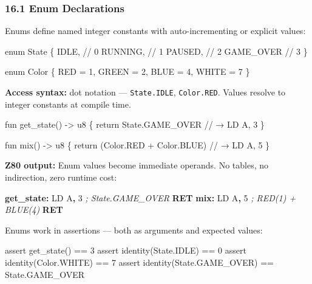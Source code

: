 \documentclass[
  11pt,
]{article}
\newenvironment{Shaded}{\begin{snugshade}}{\end{snugshade}}
\newcommand{\CommentTok}[1]{\textcolor[rgb]{0.56,0.35,0.01}{\textit{#1}}}
\newcommand{\ControlFlowTok}[1]{\textcolor[rgb]{0.13,0.29,0.53}{\textbf{#1}}}
\newcommand{\DecValTok}[1]{\textcolor[rgb]{0.00,0.00,0.81}{#1}}
\newcommand{\FunctionTok}[1]{\textcolor[rgb]{0.13,0.29,0.53}{\textbf{#1}}}
\newcommand{\NormalTok}[1]{#1}
\newcommand{\OperatorTok}[1]{\textcolor[rgb]{0.81,0.36,0.00}{\textbf{#1}}}
\begin{document}
\hypertarget{enum-declarations}{%
\subsubsection{16.1 Enum Declarations}\label{enum-declarations}}

Enums define named integer constants with auto-incrementing or explicit
values:

\begin{Shaded}
\begin{Highlighting}[]
\NormalTok{enum State \{}
\NormalTok{    IDLE,        // 0}
\NormalTok{    RUNNING,     // 1}
\NormalTok{    PAUSED,      // 2}
\NormalTok{    GAME\_OVER    // 3}
\NormalTok{\}}

\NormalTok{enum Color \{}
\NormalTok{    RED = 1,}
\NormalTok{    GREEN = 2,}
\NormalTok{    BLUE = 4,}
\NormalTok{    WHITE = 7}
\NormalTok{\}}
\end{Highlighting}
\end{Shaded}

\textbf{Access syntax:} dot notation --- \texttt{State.IDLE},
\texttt{Color.RED}. Values resolve to integer constants at compile time.

\begin{Shaded}
\begin{Highlighting}[]
\NormalTok{fun get\_state() {-}\textgreater{} u8 \{}
\NormalTok{    return State.GAME\_OVER       // → LD A, 3}
\NormalTok{\}}

\NormalTok{fun mix() {-}\textgreater{} u8 \{}
\NormalTok{    return (Color.RED + Color.BLUE)  // → LD A, 5}
\NormalTok{\}}
\end{Highlighting}
\end{Shaded}

\textbf{Z80 output:} Enum values become immediate operands. No tables,
no indirection, zero runtime cost:

\begin{Shaded}
\begin{Highlighting}[]
\FunctionTok{get\_state:}
\NormalTok{    LD A}\OperatorTok{,} \DecValTok{3}        \CommentTok{; State.GAME\_OVER}
    \ControlFlowTok{RET}
\FunctionTok{mix:}
\NormalTok{    LD A}\OperatorTok{,} \DecValTok{5}        \CommentTok{; RED(1) + BLUE(4)}
    \ControlFlowTok{RET}
\end{Highlighting}
\end{Shaded}

Enums work in assertions --- both as arguments and expected values:

\begin{Shaded}
\begin{Highlighting}[]
\NormalTok{assert get\_state() == 3}
\NormalTok{assert identity(State.IDLE) == 0}
\NormalTok{assert identity(Color.WHITE) == 7}
\NormalTok{assert identity(State.GAME\_OVER) == State.GAME\_OVER}
\end{Highlighting}
\end{Shaded}
\end{document}
